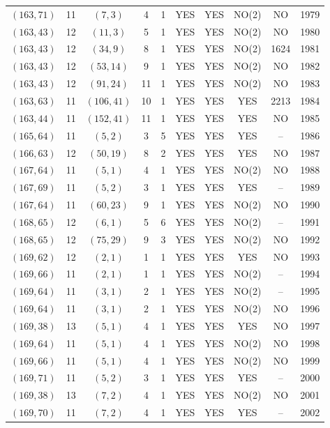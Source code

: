 \begin{longtable}{|c|c|c|c|c|c|c|c|c|c|}
$(163, 71)$ & 11 & $(7, 3)$ & 4 & 1 & YES & YES & NO(2) & NO & 1979\\
$(163, 43)$ & 12 & $(11, 3)$ & 5 & 1 & YES & YES & NO(2) & NO & 1980\\
$(163, 43)$ & 12 & $(34, 9)$ & 8 & 1 & YES & YES & NO(2) & 1624 & 1981\\
$(163, 43)$ & 12 & $(53, 14)$ & 9 & 1 & YES & YES & NO(2) & NO & 1982\\
$(163, 43)$ & 12 & $(91, 24)$ & 11 & 1 & YES & YES & NO(2) & NO & 1983\\
$(163, 63)$ & 11 & $(106, 41)$ & 10 & 1 & YES & YES & YES & 2213 & 1984\\
$(163, 44)$ & 11 & $(152, 41)$ & 11 & 1 & YES & YES & YES & NO & 1985\\
$(165, 64)$ & 11 & $(5, 2)$ & 3 & 5 & YES & YES & YES & -- & 1986\\
$(166, 63)$ & 12 & $(50, 19)$ & 8 & 2 & YES & YES & YES & NO & 1987\\
$(167, 64)$ & 11 & $(5, 1)$ & 4 & 1 & YES & YES & NO(2) & NO & 1988\\
$(167, 69)$ & 11 & $(5, 2)$ & 3 & 1 & YES & YES & YES & -- & 1989\\
$(167, 64)$ & 11 & $(60, 23)$ & 9 & 1 & YES & YES & NO(2) & NO & 1990\\
$(168, 65)$ & 12 & $(6, 1)$ & 5 & 6 & YES & YES & NO(2) & -- & 1991\\
$(168, 65)$ & 12 & $(75, 29)$ & 9 & 3 & YES & YES & NO(2) & NO & 1992\\
$(169, 62)$ & 12 & $(2, 1)$ & 1 & 1 & YES & YES & YES & NO & 1993\\
$(169, 66)$ & 11 & $(2, 1)$ & 1 & 1 & YES & YES & NO(2) & -- & 1994\\
$(169, 64)$ & 11 & $(3, 1)$ & 2 & 1 & YES & YES & NO(2) & -- & 1995\\
$(169, 64)$ & 11 & $(3, 1)$ & 2 & 1 & YES & YES & NO(2) & NO & 1996\\
$(169, 38)$ & 13 & $(5, 1)$ & 4 & 1 & YES & YES & YES & NO & 1997\\
$(169, 64)$ & 11 & $(5, 1)$ & 4 & 1 & YES & YES & NO(2) & NO & 1998\\
$(169, 66)$ & 11 & $(5, 1)$ & 4 & 1 & YES & YES & NO(2) & NO & 1999\\
$(169, 71)$ & 11 & $(5, 2)$ & 3 & 1 & YES & YES & YES & -- & 2000\\
$(169, 38)$ & 13 & $(7, 2)$ & 4 & 1 & YES & YES & NO(2) & NO & 2001\\
$(169, 70)$ & 11 & $(7, 2)$ & 4 & 1 & YES & YES & YES & -- & 2002\\

\end{longtable}
